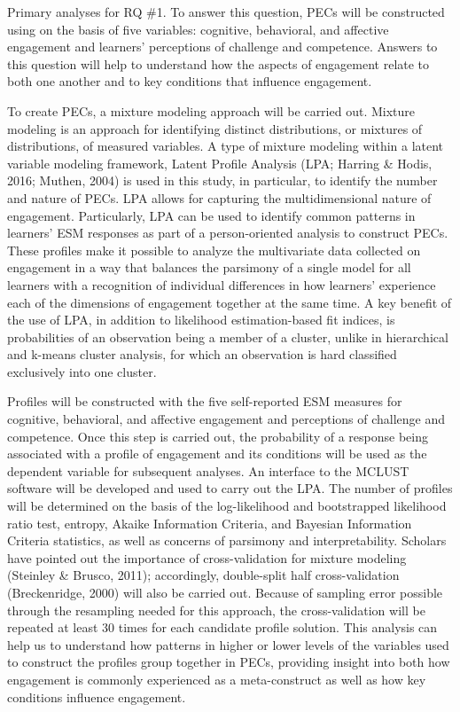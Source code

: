\documentclass[]{book}
\theoremstyle{definition}
\theoremstyle{definition}
\theoremstyle{definition}
\theoremstyle{remark}
\begin{document}
Primary analyses for RQ \#1. To answer this question, PECs will be
constructed using on the basis of five variables: cognitive, behavioral,
and affective engagement and learners' perceptions of challenge and
competence. Answers to this question will help to understand how the
aspects of engagement relate to both one another and to key conditions
that influence engagement.

To create PECs, a mixture modeling approach will be carried out. Mixture
modeling is an approach for identifying distinct distributions, or
mixtures of distributions, of measured variables. A type of mixture
modeling within a latent variable modeling framework, Latent Profile
Analysis (LPA; Harring \& Hodis, 2016; Muthen, 2004) is used in this
study, in particular, to identify the number and nature of PECs. LPA
allows for capturing the multidimensional nature of engagement.
Particularly, LPA can be used to identify common patterns in learners'
ESM responses as part of a person-oriented analysis to construct PECs.
These profiles make it possible to analyze the multivariate data
collected on engagement in a way that balances the parsimony of a single
model for all learners with a recognition of individual differences in
how learners' experience each of the dimensions of engagement together
at the same time. A key benefit of the use of LPA, in addition to
likelihood estimation-based fit indices, is probabilities of an
observation being a member of a cluster, unlike in hierarchical and
k-means cluster analysis, for which an observation is hard classified
exclusively into one cluster.

Profiles will be constructed with the five self-reported ESM measures
for cognitive, behavioral, and affective engagement and perceptions of
challenge and competence. Once this step is carried out, the probability
of a response being associated with a profile of engagement and its
conditions will be used as the dependent variable for subsequent
analyses. An interface to the MCLUST software will be developed and used
to carry out the LPA. The number of profiles will be determined on the
basis of the log-likelihood and bootstrapped likelihood ratio test,
entropy, Akaike Information Criteria, and Bayesian Information Criteria
statistics, as well as concerns of parsimony and interpretability.
Scholars have pointed out the importance of cross-validation for mixture
modeling (Steinley \& Brusco, 2011); accordingly, double-split half
cross-validation (Breckenridge, 2000) will also be carried out. Because
of sampling error possible through the resampling needed for this
approach, the cross-validation will be repeated at least 30 times for
each candidate profile solution. This analysis can help us to understand
how patterns in higher or lower levels of the variables used to
construct the profiles group together in PECs, providing insight into
both how engagement is commonly experienced as a meta-construct as well
as how key conditions influence engagement.
\end{document}

